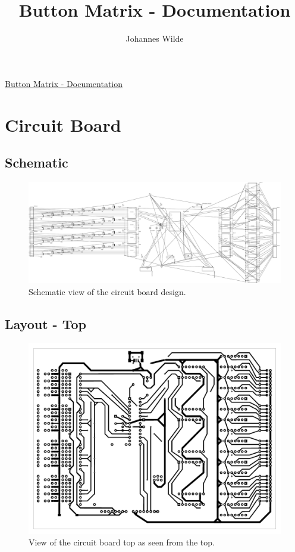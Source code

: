 \documentclass[english, parskip=half-, 11pt]{scrartcl}
\title{Button Matrix - Documentation}
\author{Johannes Wilde}
\begin{document}
\begin{center}
	\Huge \underline{Button Matrix - Documentation}
\end{center}

\section{Circuit Board}

\subsection{Schematic}

\begin{figure}[H]
	\centering
	\includegraphics[width=\textwidth]{./Images/201902_GameBoard_schem-v1.pdf}
	\caption{Schematic view of the circuit board design.}
	\label{fig:schematic}
\end{figure}
%


\subsection{Layout - Top}

\begin{figure}[H]
	\centering
	\includegraphics[width=.7\textwidth]{./Images/201902_GameBoard_fudged_final1_etch_copper_top.pdf}
	\caption{View of the circuit board top as seen from the top.}
	\label{fig:circuitTop}
\end{figure}
\end{document}
